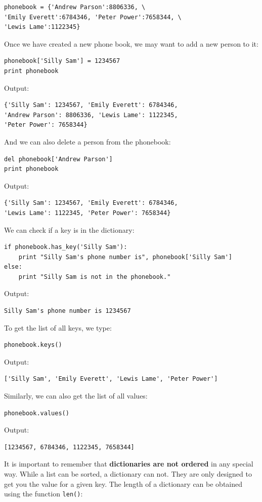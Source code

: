 \begin{verbatim}
phonebook = {'Andrew Parson':8806336, \
'Emily Everett':6784346, 'Peter Power':7658344, \
'Lewis Lame':1122345}
\end{verbatim}
Once we have created a new phone book, we may want to add a new person to it:

\begin{verbatim}
phonebook['Silly Sam'] = 1234567
print phonebook
\end{verbatim}
Output:

\begin{verbatim}
{'Silly Sam': 1234567, 'Emily Everett': 6784346, 
'Andrew Parson': 8806336, 'Lewis Lame': 1122345, 
'Peter Power': 7658344}
\end{verbatim}
And we can also delete a person from the phonebook:

\begin{verbatim}
del phonebook['Andrew Parson']
print phonebook
\end{verbatim}
Output:

\begin{verbatim}
{'Silly Sam': 1234567, 'Emily Everett': 6784346, 
'Lewis Lame': 1122345, 'Peter Power': 7658344}
\end{verbatim}
We can check if a key is in the dictionary:

\begin{verbatim}
if phonebook.has_key('Silly Sam'):
    print "Silly Sam's phone number is", phonebook['Silly Sam']
else:
    print "Silly Sam is not in the phonebook."
\end{verbatim}
Output:

\begin{verbatim}
Silly Sam's phone number is 1234567
\end{verbatim}
To get the list of all keys, we type:

\begin{verbatim}
phonebook.keys()
\end{verbatim}
Output:

\begin{verbatim}
['Silly Sam', 'Emily Everett', 'Lewis Lame', 'Peter Power']
\end{verbatim}
Similarly, we can also get the list of all values:

\begin{verbatim}
phonebook.values()
\end{verbatim}
Output:

\begin{verbatim}
[1234567, 6784346, 1122345, 7658344]
\end{verbatim}
It is important to remember that {\bf dictionaries are not ordered} in any 
special way. While a list can be sorted, a dictionary can not. They are only 
designed to get you the value for a given key. 
The length of a dictionary can be obtained using the function {\tt len()}:

